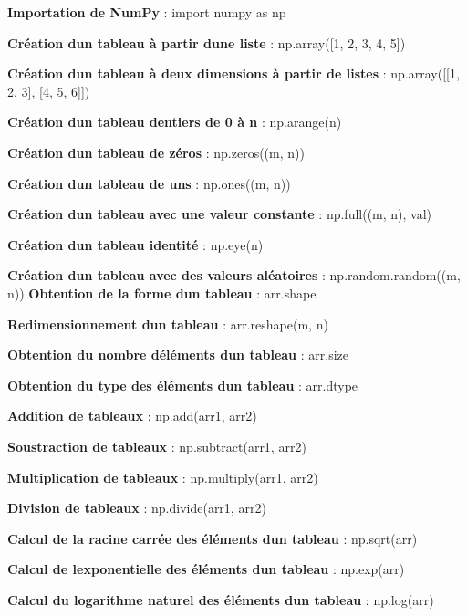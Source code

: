 {\bfseries Importation de Num\+Py} \+: {\ttfamily import numpy as np}

{\bfseries Création d\textquotesingle{}un tableau à partir d\textquotesingle{}une liste} \+: {\ttfamily np.\+array(\mbox{[}1, 2, 3, 4, 5\mbox{]})}

{\bfseries Création d\textquotesingle{}un tableau à deux dimensions à partir de listes} \+: {\ttfamily np.\+array(\mbox{[}\mbox{[}1, 2, 3\mbox{]}, \mbox{[}4, 5, 6\mbox{]}\mbox{]})}

{\bfseries Création d\textquotesingle{}un tableau d\textquotesingle{}entiers de 0 à n} \+: {\ttfamily np.\+arange(n)}

{\bfseries Création d\textquotesingle{}un tableau de zéros} \+: {\ttfamily np.\+zeros((m, n))}

{\bfseries Création d\textquotesingle{}un tableau de uns} \+: {\ttfamily np.\+ones((m, n))}

{\bfseries Création d\textquotesingle{}un tableau avec une valeur constante} \+: {\ttfamily np.\+full((m, n), val)}

{\bfseries Création d\textquotesingle{}un tableau identité} \+: {\ttfamily np.\+eye(n)}

{\bfseries Création d\textquotesingle{}un tableau avec des valeurs aléatoires} \+: {\ttfamily np.\+random.\+random((m, n))} {\bfseries Obtention de la forme d\textquotesingle{}un tableau} \+: {\ttfamily arr.\+shape}

{\bfseries Redimensionnement d\textquotesingle{}un tableau} \+: {\ttfamily arr.\+reshape(m, n)}

{\bfseries Obtention du nombre d\textquotesingle{}éléments d\textquotesingle{}un tableau} \+: {\ttfamily arr.\+size}

{\bfseries Obtention du type des éléments d\textquotesingle{}un tableau} \+: {\ttfamily arr.\+dtype}

{\bfseries Addition de tableaux} \+: {\ttfamily np.\+add(arr1, arr2)}

{\bfseries Soustraction de tableaux} \+: {\ttfamily np.\+subtract(arr1, arr2)}

{\bfseries Multiplication de tableaux} \+: {\ttfamily np.\+multiply(arr1, arr2)}

{\bfseries Division de tableaux} \+: {\ttfamily np.\+divide(arr1, arr2)}

{\bfseries Calcul de la racine carrée des éléments d\textquotesingle{}un tableau} \+: {\ttfamily np.\+sqrt(arr)}

{\bfseries Calcul de l\textquotesingle{}exponentielle des éléments d\textquotesingle{}un tableau} \+: {\ttfamily np.\+exp(arr)}

{\bfseries Calcul du logarithme naturel des éléments d\textquotesingle{}un tableau} \+: {\ttfamily np.\+log(arr)} 